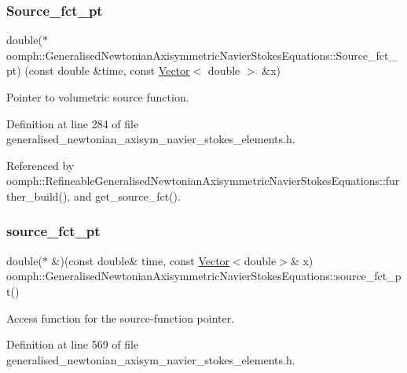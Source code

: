 \subsubsection{\texorpdfstring{Source\+\_\+fct\+\_\+pt}{Source\_fct\_pt}}
{\footnotesize\ttfamily double($\ast$ oomph\+::\+Generalised\+Newtonian\+Axisymmetric\+Navier\+Stokes\+Equations\+::\+Source\+\_\+fct\+\_\+pt) (const double \&time, const \hyperlink{classoomph_1_1Vector}{Vector}$<$ double $>$ \&x)\hspace{0.3cm}{\ttfamily [protected]}}



Pointer to volumetric source function. 



Definition at line 284 of file generalised\+\_\+newtonian\+\_\+axisym\+\_\+navier\+\_\+stokes\+\_\+elements.\+h.



Referenced by oomph\+::\+Refineable\+Generalised\+Newtonian\+Axisymmetric\+Navier\+Stokes\+Equations\+::further\+\_\+build(), and get\+\_\+source\+\_\+fct().

\mbox{\label{classoomph_1_1GeneralisedNewtonianAxisymmetricNavierStokesEquations_aacf1d66cd5eab06202b4504f1f382b5c}} 
\subsubsection{\texorpdfstring{source\+\_\+fct\+\_\+pt}{source\_fct\_pt}}
{\footnotesize\ttfamily double($\ast$ \&)(const double\& time, const \hyperlink{classoomph_1_1Vector}{Vector}$<$double$>$\& x) oomph\+::\+Generalised\+Newtonian\+Axisymmetric\+Navier\+Stokes\+Equations\+::source\+\_\+fct\+\_\+pt()\hspace{0.3cm}{\ttfamily [inline]}}



Access function for the source-\/function pointer. 



Definition at line 569 of file generalised\+\_\+newtonian\+\_\+axisym\+\_\+navier\+\_\+stokes\+\_\+elements.\+h.



